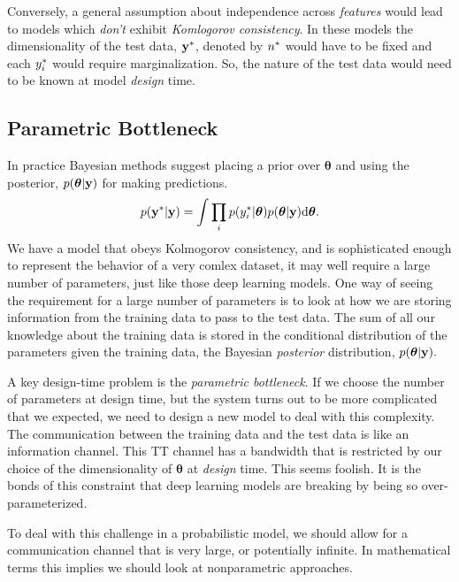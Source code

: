 \documentclass[a4paperpaper,]{article}
\begin{document}
Conversely, a general assumption about independence across
\emph{features} would lead to models which \emph{don't} exhibit
\emph{Komlogorov consistency}. In these models the dimensionality of the
test data, \(\mathbf{ y}^*\), denoted by \(n^*\) would have to be
fixed and each \(y^*_i\) would require marginalization. So,
the nature of the test data would need to be known at model
\emph{design} time.

\hypertarget{parametric-bottleneck}{%
\subsection{Parametric Bottleneck}\label{parametric-bottleneck}}


In practice Bayesian methods suggest placing a prior over
\(\boldsymbol{\theta}\) and using the posterior,
\(p(\boldsymbol{\theta}|\mathbf{ y})\) for making predictions.
\begin{align*} p(\mathbf{ y}^*|\mathbf{ y}) = \int \prod_i
p(y_i^* |
\boldsymbol{\theta})p(\boldsymbol{\theta}|\mathbf{ y})\text{d}\boldsymbol{\theta}.
\end{align*} We have a model that obeys Kolmogorov consistency, and is
sophisticated enough to represent the behavior of a very comlex dataset,
it may well require a large number of parameters, just like those deep
learning models. One way of seeing the requirement for a large number of
parameters is to look at how we are storing information from the
training data to pass to the test data. The sum of all our knowledge
about the training data is stored in the conditional distribution of the
parameters given the training data, the Bayesian \emph{posterior}
distribution, \(p(\boldsymbol{ \theta} | \mathbf{ y}).\)

A key design-time problem is the \emph{parametric bottleneck}. If we
choose the number of parameters at design time, but the system turns out
to be more complicated that we expected, we need to design a new model
to deal with this complexity. The communication between the training
data and the test data is like an information channel. This TT channel
has a bandwidth that is restricted by our choice of the dimensionality
of \(\boldsymbol{\theta}\) at \emph{design} time. This seems foolish. It
is the bonds of this constraint that deep learning models are breaking
by being so over-parameterized.

To deal with this challenge in a probabilistic model, we should allow
for a communication channel that is very large, or potentially infinite.
In mathematical terms this implies we should look at nonparametric
approaches.
\end{document}
